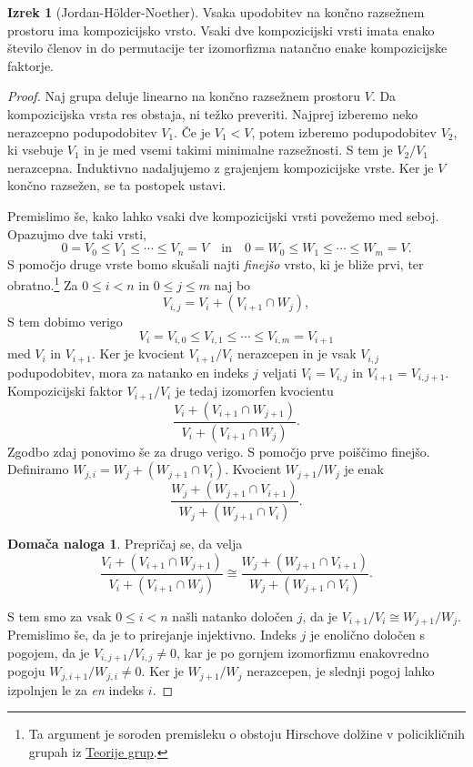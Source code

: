 \documentclass[11pt]{book}
\theoremstyle{definition}
\theoremstyle{zgled}
\theoremstyle{zgledbrezstevilke}
\theoremstyle{odprtproblem}
\theoremstyle{domacanaloga}
\newtheorem{domacanaloga}[theorem]{Domača naloga}
\newenvironment{dokaz}
    {\color{siva}\begin{proof}}
    {\end{proof}}
\theoremstyle{izrek}
\newtheorem{izrek}[theorem]{Izrek}
\begin{document}
\begin{izrek}[Jordan-Hölder-Noether]
Vsaka upodobitev na končno razsežnem prostoru ima kompozicijsko vrsto. Vsaki dve kompozicijski vrsti imata enako število členov in do permutacije ter izomorfizma natančno enake kompozicijske faktorje.
\end{izrek}
\begin{dokaz}
Naj grupa deluje linearno na končno razsežnem prostoru $V$. Da kompozicijska vrsta res obstaja, ni težko preveriti. Najprej izberemo neko nerazcepno podupodobitev $V_1$. Če je $V_1 < V$, potem izberemo podupodobitev $V_2$, ki vsebuje $V_1$ in je med vsemi takimi minimalne razsežnosti. S tem je $V_2/V_1$ nerazcepna. Induktivno nadaljujemo z grajenjem kompozicijske vrste. Ker je $V$ končno razsežen, se ta postopek ustavi.

Premislimo še, kako lahko vsaki dve kompozicijski vrsti povežemo med seboj. Opazujmo dve taki vrsti,
\[
    0 = V_0 \leq V_1 \leq \cdots \leq V_n = V 
    \quad \text{in} \quad
    0 = W_0 \leq W_1 \leq \cdots \leq W_m = V.
\]
S pomočjo druge vrste bomo skušali najti \emph{finejšo} vrsto, ki je bliže prvi, ter obratno.\footnote{Ta argument je soroden premisleku o obstoju Hirschove dolžine v policikličnih grupah iz \href{https://urbanjezernik.github.io/teorija-grup/}{Teorije grup}.} Za $0 \leq i < n$ in $0 \leq j \leq m$ naj bo
\[
    V_{i,j} = V_i + (V_{i+1} \cap W_j),
\]
S tem dobimo verigo
\[
    V_i = V_{i,0} \leq V_{i,1} \leq \cdots \leq V_{i,m} = V_{i+1}
\]
med $V_i$ in $V_{i+1}$. Ker je kvocient $V_{i+1}/V_i$ nerazcepen in je vsak $V_{i,j}$ podupodobitev, mora za natanko en indeks $j$ veljati $V_i = V_{i,j}$ in $V_{i+1} = V_{i,j+1}$. Kompozicijski faktor $V_{i+1}/V_i$ je tedaj izomorfen kvocientu
\[
    \frac{V_i + (V_{i+1} \cap W_{j+1})}{V_i + (V_{i+1} \cap W_j)}.
\]
Zgodbo zdaj ponovimo še za drugo verigo. S pomočjo prve poiščimo finejšo. Definiramo $W_{j,i} = W_j + (W_{j+1} \cap V_i)$. Kvocient $W_{j+1}/W_j$ je enak
\[
    \frac{W_j + (W_{j+1} \cap V_{i+1})}{W_j + (W_{j+1} \cap V_i)}.
\]

\begin{domacanaloga}
Prepričaj se, da velja
\[
    \frac{V_i + (V_{i+1} \cap W_{j+1})}{V_i + (V_{i+1} \cap W_j)}
    \cong
    \frac{W_j + (W_{j+1} \cap V_{i+1})}{W_j + (W_{j+1} \cap V_i)}.
\]
\end{domacanaloga}

S tem smo za vsak $0 \leq i < n$ našli natanko določen $j$, da je $V_{i+1}/V_i \cong W_{j+1}/W_j$. Premislimo še, da je to prirejanje injektivno. Indeks $j$ je enolično določen s pogojem, da je $V_{i,j+1}/V_{i,j} \neq 0$, kar je po gornjem izomorfizmu enakovredno pogoju $W_{j,i+1}/W_{j,i} \neq 0$. Ker je $W_{j+1}/W_j$ nerazcepen, je slednji pogoj lahko izpolnjen le za \emph{en} indeks $i$.
\end{dokaz}
\end{document}
